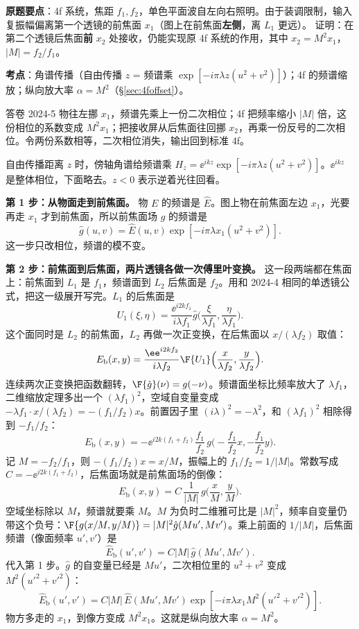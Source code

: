 \noindent\textbf{原题要点}：4f 系统，焦距 $f_1,f_2$，单色平面波自左向右照明。由于装调限制，输入复振幅偏离第一个透镜的前焦面 $x_1$（图上在前焦面\textbf{左侧}，离 $L_1$ 更远）。
证明：在第二个透镜后焦面\textbf{前} $x_2$ 处接收，仍能实现原 4f 系统的作用，其中 $x_2=M^2x_1$，$|M|=f_2/f_1$。

\textbf{考点}：角谱传播（自由传播 $z$ = 频谱乘 $\exp[-i\pi\lambda z(u^2+v^2)]$）；4f 的频谱缩放；纵向放大率 $\alpha=M^2$（§\ref{sec:4foffset}）。

\begin{exam}{答卷 2024-5}
物往左挪 $x_1$，频谱先乘上一份二次相位；4f 把频率缩小 $|M|$ 倍，这份相位的系数变成 $M^2x_1$；把接收屏从后焦面往回挪 $x_2$，再乘一份反号的二次相位。令两份系数相等，二次相位消失，输出回到标准 4f。

自由传播距离 $z$ 时，傍轴角谱给频谱乘 $H_z=\ee^{ikz}\exp[-i\pi\lambda z(u^2+v^2)]$。$\ee^{ikz}$ 是整体相位，下面略去。$z<0$ 表示逆着光往回看。

\textbf{第 1 步：从物面走到前焦面。}
物 $E$ 的频谱是 $\hat E$。图上物在前焦面左边 $x_1$，光要再走 $x_1$ 才到前焦面，所以前焦面场 $g$ 的频谱是
\[
\hat g(u,v)=\hat E(u,v)\exp[-i\pi\lambda x_1(u^2+v^2)] .
\]
这一步只改相位，频谱的模不变。

\textbf{第 2 步：前焦面到后焦面，两片透镜各做一次傅里叶变换。}
这一段两端都在焦面上：前焦面到 $L_1$ 是 $f_1$，频谱面到 $L_2$ 后焦面是 $f_2$。用和 2024-4 相同的单透镜公式，把这一级展开写完。$L_1$ 的后焦面是
\[
U_1(\xi,\eta)=\frac{\ee^{i2kf_1}}{i\lambda f_1}\hat g\Big(\frac{\xi}{\lambda f_1},\frac{\eta}{\lambda f_1}\Big).
\]
这个面同时是 $L_2$ 的前焦面，$L_2$ 再做一次正变换，在后焦面以 $x/(\lambda f_2)$ 取值：
\[
E_{\text{b}}(x,y)=\frac{\ee^{i2kf_2}}{i\lambda f_2}\F\{U_1\}\Big(\frac{x}{\lambda f_2},\frac{y}{\lambda f_2}\Big).
\]
连续两次正变换把函数翻转，$\F\{\hat g\}(\nu)=g(-\nu)$。频谱面坐标比频率放大了 $\lambda f_1$，二维缩放定理多出一个 $(\lambda f_1)^2$，空域自变量变成 $-\lambda f_1\cdot x/(\lambda f_2)=-(f_1/f_2)x$。前置因子里 $(i\lambda)^2=-\lambda^2$，和 $(\lambda f_1)^2$ 相除得到 $-f_1/f_2$：
\[
E_{\text{b}}(x,y)=-\ee^{i2k(f_1+f_2)}\frac{f_1}{f_2}\,g\Big(-\frac{f_1}{f_2}x,-\frac{f_1}{f_2}y\Big).
\]
记 $M=-f_2/f_1$，则 $-(f_1/f_2)x=x/M$，振幅上的 $f_1/f_2=1/|M|$。常数写成 $C=-\ee^{i2k(f_1+f_2)}$，后焦面场就是前焦面场的倒像：
\[
E_{\text{b}}(x,y)=C\,\frac{1}{|M|}\,g\Big(\frac xM,\frac yM\Big).
\]
空域坐标除以 $M$，频谱就要乘 $M$。$M$ 为负时二维雅可比是 $|M|^2$，频率自变量仍带这个负号：$\F\{g(x/M,y/M)\}=|M|^2\hat g(Mu',Mv')$。乘上前面的 $1/|M|$，后焦面频谱（像面频率 $u',v'$）是
\[
\hat E_{\text{b}}(u',v')=C|M|\,\hat g(Mu',Mv').
\]
代入第 1 步。$\hat g$ 的自变量已经是 $Mu'$，二次相位里的 $u^2+v^2$ 变成 $M^2(u'^2+v'^2)$：
\[
\hat E_{\text{b}}(u',v')=C|M|\,\hat E(Mu',Mv')\exp[-i\pi\lambda x_1 M^2(u'^2+v'^2)] .
\]
物方多走的 $x_1$，到像方变成 $M^2x_1$。这就是纵向放大率 $\alpha=M^2$。


\end{exam}
